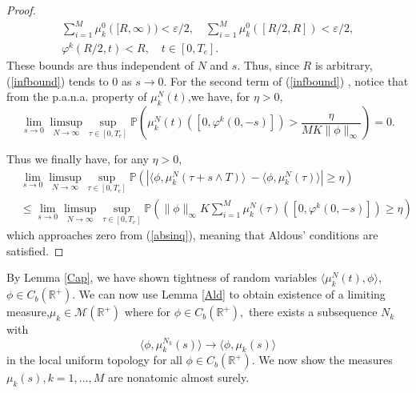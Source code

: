 \begin{proof}
\begin{eqnarray}
\sum_{i = 1}^M \mu_k^0([R,\infty))<\varepsilon/2, \quad  \sum_{i = 1}^M\mu_k^0([R/2, R]) < \varepsilon/2, \\
\varphi^k(R/2, t)<R, \quad t \in [0,T_e]. \nonumber 
\end{eqnarray}
 These bounds are thus independent of $N$ and $s$. Thus, since $R$ is arbitrary, (\ref{infbound}) tends to 0 as $s\rightarrow 0$.  For the second term of (\ref{infbound}) , notice that from the   p.a.n.a. property of $\mu_k^N(t)$,we have, for $\eta>0,$
\begin{equation}\label{absinq}
\lim_{s \rightarrow 0}\limsup_{N\rightarrow \infty}\sup_{\tau \in [0,T_e]}\mathbb P\left(\mu_k^N(t)([0,\varphi^k (0,-s)])>\frac{\eta}{MK\|\phi\|_\infty }\right) = 0.
\end{equation}

Thus we finally have, for any $\eta>0$,
\begin{align}
&\lim_{s\rightarrow 0}\limsup_{N\rightarrow \infty}\sup_{\tau \in [0,T_e]}\mathbb{P}(|\langle\phi,\mu_k^N(\tau+s \wedge T)\rangle \  - \langle\phi,\mu_k^N(\tau)\rangle|\ge\eta) \\
 &\le  \lim_{s\rightarrow 0}\limsup_{N\rightarrow \infty}\sup_{\tau \in [0,T_e]}\mathbb{P}\left(\|\phi\|_\infty K\sum_{i = 1}^M\mu_{k}^N(\tau)([0,\varphi^k (0,-s)])\ge\eta\right) \nonumber \end{align}
which approaches zero from (\ref{absinq}), meaning that Aldous' conditions are satisfied.
\end{proof}
By Lemma \ref{Cap}, we have shown tightness of random variables $\langle \mu_k^N(t), \phi\rangle$,   $\phi \in C_b(\mathbb{R}^+)$.  We can now use Lemma \ref{Ald} to obtain existence of a limiting measure,$\mu_k\in \mathcal{M}(\mathbb{R}^+)$ where for $\phi \in C_b(\mathbb{R}^+),$ there exists a subsequence $N_k$ with                  
\begin{equation}\label{pairbound}
\langle \phi, \mu_k^{N_k}(s) \rangle \rightarrow \langle \phi, \mu_k(s) \rangle
\end{equation}
in the local uniform topology for all $\phi \in C_b(\mathbb{R}^+).$  We now show the measures $\mu_k(s), k = 1,\dots, M$ are nonatomic almost surely.

